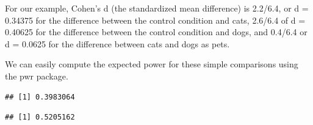 \documentclass[]{book}
\newenvironment{Shaded}{\begin{snugshade}}{\end{snugshade}}
\newcommand{\DataTypeTok}[1]{\textcolor[rgb]{0.13,0.29,0.53}{#1}}
\newcommand{\DecValTok}[1]{\textcolor[rgb]{0.00,0.00,0.81}{#1}}
\newcommand{\FloatTok}[1]{\textcolor[rgb]{0.00,0.00,0.81}{#1}}
\newcommand{\KeywordTok}[1]{\textcolor[rgb]{0.13,0.29,0.53}{\textbf{#1}}}
\newcommand{\NormalTok}[1]{#1}
\newcommand{\OperatorTok}[1]{\textcolor[rgb]{0.81,0.36,0.00}{\textbf{#1}}}
\newcommand{\StringTok}[1]{\textcolor[rgb]{0.31,0.60,0.02}{#1}}
\begin{document}
For our example, Cohen's d (the standardized mean difference) is 2.2/6.4, or d = 0.34375 for the difference between the control condition and cats, 2.6/6.4 of d = 0.40625 for the difference between the control condition and dogs, and 0.4/6.4 or d = 0.0625 for the difference between cats and dogs as pets.

We can easily compute the expected power for these simple comparisons using the pwr package.

\begin{Shaded}
\end{Shaded}

\begin{verbatim}
## [1] 0.3983064
\end{verbatim}

\begin{Shaded}
\end{Shaded}

\begin{verbatim}
## [1] 0.5205162
\end{verbatim}

\begin{Shaded}
\end{Shaded}
\end{document}
